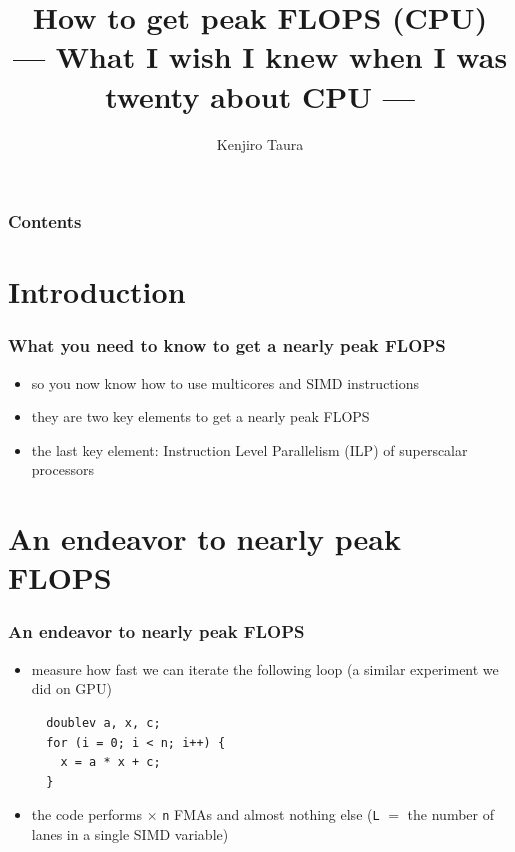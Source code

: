 \documentclass[12pt,dvipdfmx]{beamer}
\title{How to get peak FLOPS (CPU) \\
  --- What I wish I knew when I was twenty about CPU ---}
\institute{}
\author{Kenjiro Taura}
\date{}
\newcommand{\ao}[1]{{\color{blue}#1}}
\begin{document}
\maketitle

\begin{frame}
\frametitle{Contents}
\tableofcontents
\end{frame}


\section{Introduction}

\begin{frame}
\frametitle{What you need to know to get a nearly peak FLOPS}
\begin{itemize}
\item so you now know how to use multicores and SIMD instructions

\item they are two key elements to get a nearly peak FLOPS

\item the last key element: \ao{Instruction Level Parallelism (ILP)}
  of superscalar processors
\end{itemize}
\end{frame}


\section{An endeavor to nearly peak FLOPS}
\begin{frame}[fragile]
\frametitle{An endeavor to nearly peak FLOPS}
\begin{itemize}
\item measure how fast we can iterate the following loop (a similar experiment we did on GPU)

\begin{lstlisting}
  doublev a, x, c;
  for (i = 0; i < n; i++) {
    x = a * x + c;
  }
\end{lstlisting}

\item the code performs \ao{{\tt L} $\times$ {\tt n}} FMAs and almost nothing else
  ({\tt L} $=$ the number of lanes in a single SIMD variable)
\end{itemize}
\end{frame}
\end{document}
